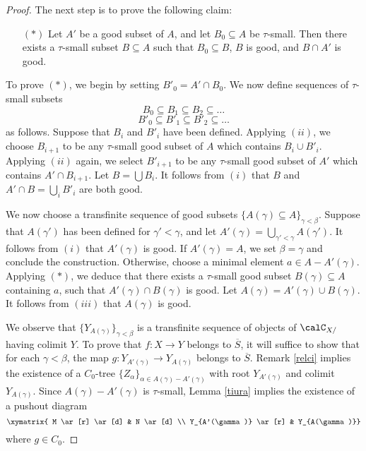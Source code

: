 \begin{proof}
The next step is to prove the following claim:
\begin{itemize}
\item[$(\ast)$] Let $A'$ be a good subset of $A$, and let $B_0 \subseteq A$ be $\tau$-small. Then
there exists a $\tau$-small subset $B \subseteq A$ such that $B_0 \subseteq B$, $B$ is good, and $B \cap A'$ is good.
\end{itemize}

To prove $(\ast)$, we begin by setting $B'_0 = A' \cap B_0$. We now define sequences of $\tau$-small subsets
$$ B_0 \subseteq B_1 \subseteq B_2 \subseteq \ldots $$
$$ B'_0 \subseteq B'_1 \subseteq B'_2 \subseteq \ldots$$
as follows. Suppose that $B_i$ and $B'_{i}$ have been defined. Applying $(ii)$, we choose
$B_{i+1}$ to be any $\tau$-small good subset of $A$ which contains $B_i \cup B'_{i}$.
Applying $(ii)$ again, we select $B'_{i+1}$ to be any $\tau$-small good subset of $A'$ which contains $A' \cap B_{i+1}$. Let $B = \bigcup B_{i}$. It follows from $(i)$ that $B$ and $A' \cap B = \bigcup_{i} B'_{i}$ are both good.

We now choose a transfinite sequence of good subsets $\{ A(\gamma) \subseteq A \}_{\gamma < \beta}$. Suppose that $A(\gamma')$ has been defined for $\gamma' < \gamma$, and let
$A'(\gamma) = \bigcup_{\gamma' < \gamma} A(\gamma')$. It follows from $(i)$ that
$A'(\gamma)$ is good. If $A'(\gamma) = A$, we set $\beta = \gamma$ and conclude the construction. Otherwise, choose a minimal element 
$a \in A - A'(\gamma)$. Applying $(\ast)$, we deduce that there exists a $\tau$-small good subset
$B(\gamma) \subseteq A$ containing $a$, such that $A'(\gamma) \cap B(\gamma)$ is good. Let $A(\gamma) = A'(\gamma) \cup B(\gamma)$. It follows from $(iii)$ that $A(\gamma)$ is good. 

We observe that $\{ Y_{A(\gamma)} \}_{\gamma < \beta}$ is a transfinite sequence of objects of
$\calC_{X/}$ having colimit $Y$. To prove that $f: X \rightarrow Y$ belongs to $\overline{S}$, it will suffice to show that for each $\gamma < \beta$, the map $g: Y_{A'(\gamma)} \rightarrow Y_{A(\gamma)}$ belongs to $\overline{S}$. Remark \ref{relci} implies the existence of a $C_0$-tree
$\{ Z_{\alpha} \}_{\alpha \in A(\gamma) - A'(\gamma)}$ with root $Y_{A'(\gamma)}$ and colimit $Y_{A(\gamma)}$. Since $A(\gamma) - A'(\gamma)$ is $\tau$-small, Lemma \ref{tiura} implies the existence of a pushout diagram 
$$ \xymatrix{ M \ar[r] \ar[d] & N \ar[d] \\
Y_{A'(\gamma)} \ar[r] & Y_{A(\gamma)}}$$
where $g \in C_0$. 


\end{proof}
